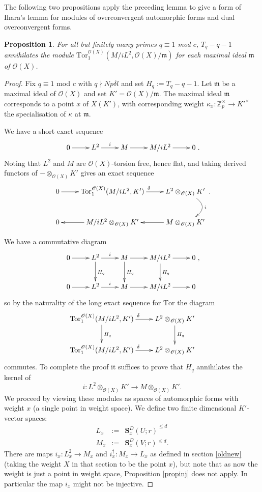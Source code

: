 \documentclass[a4paper, notitlepage]{amsart}
\newcommand{\Z}{\ensuremath{\mathbb{Z}}\xspace}
\newcommand{\m}{\ensuremath{\mathfrak{m}}\xspace}
\newcommand{\M}{\ensuremath{\mathfrak{M}}\xspace}
\newcommand{\OO}{\ensuremath{\mathscr{O}}\xspace}
\newtheorem{proposition}[theorem]{Proposition}
\newcommand{\OCS}{\ensuremath{\mathbf{S}^D_{x}(U;r)}\xspace}
\newcommand{\OCVS}{\ensuremath{\mathbf{S}^D_{x}(V;r)}\xspace}
\newcommand{\s}{\ensuremath{^{\leq d}}\xspace}
\begin{document}
The following two propositions apply the preceding lemma to give a form of Ihara's lemma for modules of overconvergent automorphic forms and dual overconvergent forms.
\begin{proposition}\label{preihara}
For all but finitely many primes $q\equiv 1$ mod $c$, $T_q-q-1$ annihilates the module $\mathrm{Tor}_1^{\OO(X)}(M/iL^2,\OO(X)/\m)$ for each maximal ideal $\m$ of $\OO(X)$. 
\end{proposition}
\begin{proof}
Fix $q \equiv 1$ mod $c$ with $q \nmid Np\delta l$ and set $H_q:=T_q-q-1$. Let $\m$ be a maximal ideal of $\OO(X)$ and set $K' = \OO(X)/\m$. The maximal ideal $\m$ corresponds to a point $x$ of $X(K')$, with corresponding weight $\kappa_x:\Z_p^\times\rightarrow K'^\times$ the specialisation of $\kappa$ at $\m$.

We have a short exact sequence
$$\xymatrix{
0\ar[r]&L^2\ar[r]^i&M\ar[r]&M/iL^2\ar[r]&0
}.$$
Noting that $L^2$ and $M$ are $\OO(X)$-torsion free, hence flat, and taking derived functors of $-\otimes_{\OO(X)}K'$ gives an exact sequence
$$\xymatrix{
0\ar[r]&\mathrm{Tor}^{\OO(X)}_1(M/iL^2,K')\ar[r]^\delta&L^2\otimes_{\OO(X)}K'\ar@/^2pc/[d]^i\\
0&M/iL^2\otimes_{\OO(X)}K'\ar[l]&M\otimes_{\OO(X)}K'\ar[l]
}.$$

We have a commutative diagram 
$$\xymatrix{
0\ar[r]&L^2\ar[r]^i\ar[d]^{H_q}&M\ar[r]\ar[d]^{H_q}&M/iL^2\ar[r]\ar[d]^{H_q}&0\\
0\ar[r]&L^2\ar[r]^i&M\ar[r]&M/iL^2\ar[r]&0\\
},$$
so by the naturality of the long exact sequence for $\mathrm{Tor}$ the diagram
$$\xymatrix{
\mathrm{Tor}^{\OO(X)}_1(M/iL^2,K')\ar[r]^\delta\ar[d]^{H_q}&L^2\otimes_{\OO(X)}K'\ar[d]^{H_q}\\
\mathrm{Tor}^{\OO(X)}_1(M/iL^2,K')\ar[r]^\delta&L^2\otimes_{\OO(X)}K'
}$$ commutes. To complete the proof it suffices to prove that $H_q$ annihilates the kernel of $$i:L^2\otimes_{\OO(X)}K' \rightarrow M\otimes_{\OO(X)}K'.$$ We proceed by viewing these modules as spaces of automorphic forms with weight $x$ (a single point in weight space). We define two finite dimensional $K'$-vector spaces: \begin{eqnarray*}L_x&:=&\OCS^{\leq d} \\M_x&:=&\OCVS\s.\end{eqnarray*} There are maps $i_x:L_x^2 \rightarrow M_x$ and $i^\dagger_x:M_x \rightarrow L_x$ as defined in section \ref{oldnew} (taking the weight $X$ in that section to be the point $x$), but note that as now the weight is just a point in weight space, Proposition \ref{propinj} does not apply. In particular the map $i_x$ might not be injective.


\end{proof}
\end{document}
